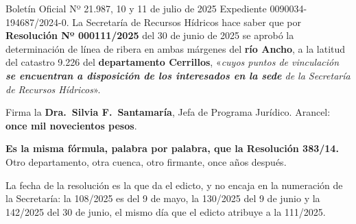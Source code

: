 \begin{ficha}{Boletín Oficial Nº 21.987, 10 y 11 de julio de 2025}
Expediente 0090034-194687/2024-0. La Secretaría de Recursos Hídricos hace saber que por
\textbf{Resolución Nº 000111/2025} del 30 de junio de 2025 se aprobó la determinación de línea
de ribera en ambas márgenes del \textbf{río Ancho}, a la latitud del catastro 9.226 del
\textbf{departamento Cerrillos}, «\textit{cuyos puntos de vinculación \textbf{se encuentran a
disposición de los interesados en la sede} de la Secretaría de Recursos Hídricos}».

Firma la \textbf{Dra.\ Silvia F.\ Santamaría}, Jefa de Programa
Jurídico. Arancel: \textbf{once mil novecientos pesos}.
\end{ficha}

\textbf{Es la misma fórmula, palabra por palabra, que la Resolución 383/14.} Otro departamento,
otra cuenca, otro firmante, once años después.

La fecha de la resolución es la que da el edicto, y no encaja en la numeración de la
Secretaría: la 108/2025 es del 9 de mayo, la 130/2025 del 9 de junio y la 142/2025 del 30 de
junio, el mismo día que el edicto atribuye a la 111/2025. 

